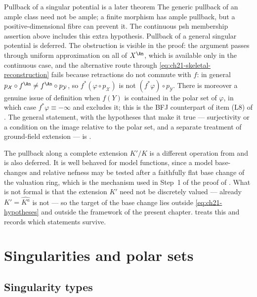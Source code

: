 \begin{warning}{Pullback of a singular potential is a later theorem}
The generic pullback of an ample class need not be ample; a finite
morphism has ample pullback, but a positive-dimensional fibre can prevent
it.  The continuous psh membership assertion above includes this extra
hypothesis.  Pullback of a general singular potential is deferred.  The
obstruction is visible in the proof: the argument passes through uniform
approximation on all of $X^{\An}$, which is available only in the
continuous case, and the alternative route through
\eqref{eq:ch21-skeletal-reconstruction} fails because retractions do not
commute with $f$: in general
$p_{\mathcal X}\circ f^{\An}\neq f^{\An}\circ p_{\mathcal Y}$, so
$f^*(\varphi\circ p_{\mathcal X})$ is not $(f^*\varphi)\circ
p_{\mathcal Y}$.  There is moreover a genuine issue of definition when
$f(Y)$ is contained in the polar set of $\varphi$, in which case
$f^*\varphi\equiv-\infty$ and  excludes it; this is
the BFJ counterpart of item (L8) of .  The
general statement, with the hypotheses that make it true --- surjectivity or
a condition on the image relative to the polar set, and a separate treatment
of ground-field extension --- is
.
\end{warning}

\begin{remark}
\label{rem:ch21-base-change}
The pullback along a complete extension $K'/K$ is a different operation
from  and is also deferred.  It is well behaved for
model functions, since a model base-changes and relative nefness may be
tested after a faithfully flat base change of the valuation ring, which is
the mechanism used in Step~1 of the proof of
.  What is not formal is that the
extension $K'$ need not be discretely valued --- already
$K'=\widehat{K^a}$ is not --- so the target of the base change lies
outside \eqref{eq:ch21-hypotheses} and outside the framework of the present
chapter.   treats this and records which
statements survive.
\end{remark}

\section{Singularities and polar sets}
\label{sec:ch21-singularities}

\subsection{Singularity types}
\label{sec:ch21-singularity-types}

